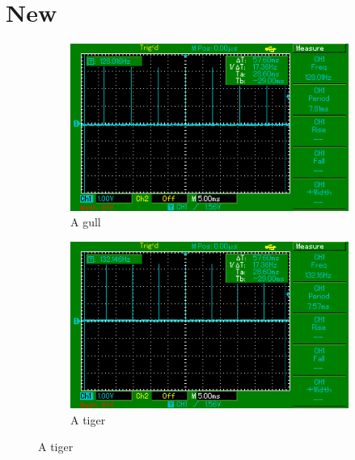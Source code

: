 \chapter{New}
\begin{figure}[HT!]
	\centering
	\begin{subfigure}{8cm}
		\centering
		\includegraphics[keepaspectratio,width=\textwidth]{fig/osc-no-adjust.png}
		\caption{A gull}
		\label{fig:gull}
	\end{subfigure}%
	  
	\begin{subfigure}{8cm}
		\centering
		\includegraphics[keepaspectratio,width=\textwidth]{fig/osc-speed-up.png}
		\caption{A tiger}
		\label{fig:tiger}
	\end{subfigure}


\end{figure}
